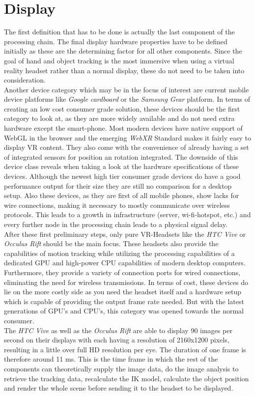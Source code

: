  \section{Display}
 The first definition that has to be done is actually the last component of the processing chain. The final display hardware properties have to be defined initially as these are the determining factor for all other components. Since the goal of hand and object tracking is the most immersive when using a virtual reality headset rather than a normal display, these do not need to be taken into consideration.\\
Another device category which may be in the focus of interest are current mobile device platforms like \textit{Google cardboard} or the \textit{Samsung Gear} platform. In terms of creating an low cost consumer grade solution, these devices should be the first category to look at, as they are more widely available and do not need extra hardware except the smart-phone. Most modern devices have native support of WebGL in the browser and the emerging \textit{WebXR} Standard makes it fairly easy to display VR content. They also come with the convenience of already having a set of integrated sensors for position an rotation integrated. The downside of this device class reveals when taking a look at the hardware specifications of these devices. Although the newest high tier consumer grade devices do have a good performance output for their size they are still no comparison for a desktop setup. Also these devices, as they are first of all mobile phones, show lacks for wire connections, making it necessary to mostly communicate over wireless protocols. This leads to a growth in infrastructure (server, wi-fi-hotspot, etc.) and every further node in the processing chain leads to a physical signal delay.\\
After these first preliminary steps, only pure VR-Headsets like the \textit{HTC Vive} \cite{HTC.2018} or \textit{Occulus Rift} \cite{OculusVR.2018} should be the main focus. These headsets also provide the capabilities of motion tracking while utilizing the processing capabilities of a dedicated GPU and high-power CPU capabilities of modern desktop computers. Furthermore, they provide a variety of connection ports for wired connections, eliminating the need for wireless transmissions. In terms of cost, these devices do lie on the more costly side as you need the headset itself and a hardware setup which is capable of providing the output frame rate needed. But with the latest generations of GPU's and CPU's, this category was opened towards the normal consumer.\\
The \textit{HTC Vive} as well as the \textit{Occulus Rift} are able to display 90 images per second on their displays with each having a resolution of 2160x1200 pixels, resulting in a little over full HD resolution per eye. The duration of one frame is therefore around 11 ms. This is the time frame in which the rest of the components can theoretically supply the image data, do the image analysis to retrieve the tracking data, recalculate the IK model, calculate the object position and render the whole scene before sending it to the headset to be displayed.
